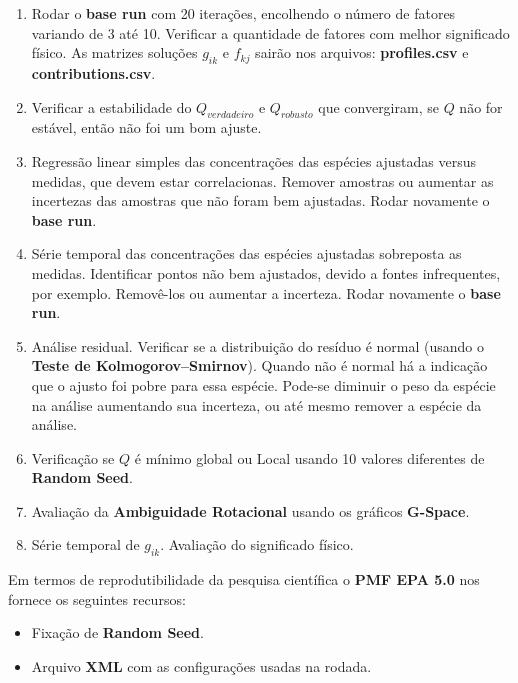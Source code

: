 \begin{enumerate}
  \item Rodar o \textbf{base run} com 20 iterações, encolhendo o número de 
        fatores variando de 3 até 10. 
        Verificar a quantidade de fatores com melhor significado físico. 
        As matrizes soluções $g_{ik}$ e $f_{kj}$ sairão nos arquivos: 
        \textbf{profiles.csv} e \textbf{contributions.csv}.
  \item Verificar a estabilidade do $Q_{verdadeiro}$ e $Q_{robusto}$ que 
        convergiram, se $Q$ não for estável, então não foi um bom ajuste.
  \item Regressão linear simples das concentrações das espécies ajustadas 
        versus medidas, que devem estar correlacionas. 
        Remover amostras ou aumentar as incertezas das amostras que não foram 
        bem ajustadas. Rodar novamente o \textbf{base run}.  
  \item Série temporal das concentrações das espécies ajustadas sobreposta
        as medidas. 
        Identificar pontos não bem ajustados, devido a fontes infrequentes, 
        por exemplo.
        Removê-los ou aumentar a incerteza. Rodar novamente o \textbf{base run}.
  \item Análise residual. Verificar se a distribuição do resíduo é normal 
        (usando o \textbf{Teste de Kolmogorov–Smirnov}). 
        Quando não é normal há a indicação que o ajusto foi pobre para essa 
        espécie. 
        Pode-se diminuir o peso da espécie na análise aumentando sua incerteza, 
        ou até mesmo remover a espécie da análise.
  \item Verificação se $Q$ é mínimo global ou Local usando 10 valores 
        diferentes de \textbf{Random Seed}.
  \item Avaliação da \textbf{Ambiguidade Rotacional} usando os 
        gráficos \textbf{G-Space}.
  \item Série temporal de $g_{ik}$. Avaliação do significado físico.
\end{enumerate}

Em termos de reprodutibilidade da pesquisa científica o \textbf{PMF EPA 5.0} 
nos fornece os seguintes recursos:

\begin{itemize}
  \item Fixação de \textbf{Random Seed}.%
  \item Arquivo \textbf{XML} com as configurações usadas na rodada. 
\end{itemize} 
